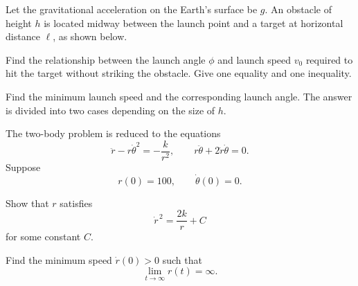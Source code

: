 \begin{problem}
Let the gravitational acceleration on the Earth's surface be $g$. An obstacle of height $h$ is located midway between the launch point and a target at horizontal distance $\ell$, as shown below.

\begin{center}
\end{center}

\begin{problemsubparts}
\item Find the relationship between the launch angle $\phi$ and launch speed $v_0$ required to hit the target without striking the obstacle. Give one equality and one inequality.
\item Find the minimum launch speed and the corresponding launch angle. The answer is divided into two cases depending on the size of $h$.
\end{problemsubparts}
\end{problem}

\begin{problem}
The two-body problem is reduced to the equations
\[
\ddot r-r\dot\theta^2=-\frac{k}{r^2},
\qquad
r\ddot\theta+2\dot r\dot\theta=0.
\]
Suppose
\[
r(0)=100,
\qquad
\dot\theta(0)=0.
\]
\begin{problemsubparts}
\item Show that $r$ satisfies
\[
\dot r^{\,2}=\frac{2k}{r}+C
\]
for some constant $C$.
\item Find the minimum speed $\dot r(0)>0$ such that
\[
\lim_{t\to\infty}r(t)=\infty.
\]
\end{problemsubparts}
\end{problem}

